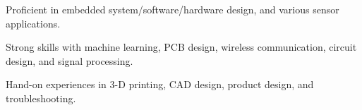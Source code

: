 

\begin{cvparagraph}

    \vspace{12pt}
\begin{cvitems}
    \setlength{\itemsep}{2pt}
    \item Proficient in embedded system/software/hardware design, and various sensor applications.
    \item Strong skills with machine learning, PCB design, wireless communication, circuit design, and signal processing.
    \item Hand-on experiences in 3-D printing, CAD design, product design, and troubleshooting.
\end{cvitems}
\end{cvparagraph}
